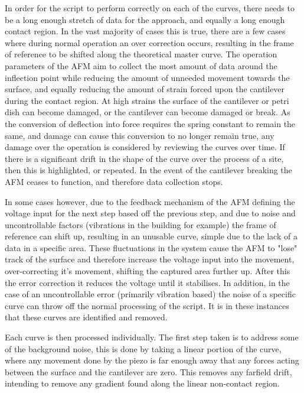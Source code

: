 In order for the script to perform correctly on each of the curves, there needs to be a long enough stretch of data for the approach, and equally a long enough contact region. In the vast majority of cases this is true, there are a few cases where during normal operation an over correction occurs, resulting in the frame of reference to be shifted along the theoretical master curve. The operation parameters of the AFM aim to collect the most amount of data around the inflection point while reducing the amount of unneeded movement towards the surface, and equally reducing the amount of strain forced upon the cantilever during the contact region. At high strains the surface of the cantilever or petri dish can become damaged, or the cantilever can become damaged or break. As the conversion of deflection into force requires the spring constant to remain the same, and damage can cause this conversion to no longer remain true, any damage over the operation is considered by reviewing the curves over time. If there is a significant drift in the shape of the curve over the process of a site, then this is highlighted, or repeated. In the event of the cantilever breaking the AFM ceases to function, and therefore data collection stops.%

In some cases however, due to the feedback mechanism of the AFM defining the voltage input for the next step based off the previous step, and due to noise and uncontrollable factors (vibrations in the building for example) the frame of reference can shift up, resulting in an unusable curve, simple due to the lack of a data in a specific area. These fluctuations in the system cause the AFM to "lose" track of the surface and therefore increase the voltage input into the movement, over-correcting it's movement, shifting the captured area further up. After this the error correction it reduces the voltage until it stabilises. In addition, in the case of an uncontrollable error (primarily vibration based) the noise of a specific curve can throw off the normal processing of the script. It is in these instances that these curves are identified and removed.





Each curve is then processed individually. The first step taken is to address some of the background noise, this is done by taking a linear portion of the curve, where any movement done by the piezo is far enough away that any forces acting between the surface and the cantilever are zero. This removes any farfield drift, intending to remove any gradient found along the linear non-contact region. 

